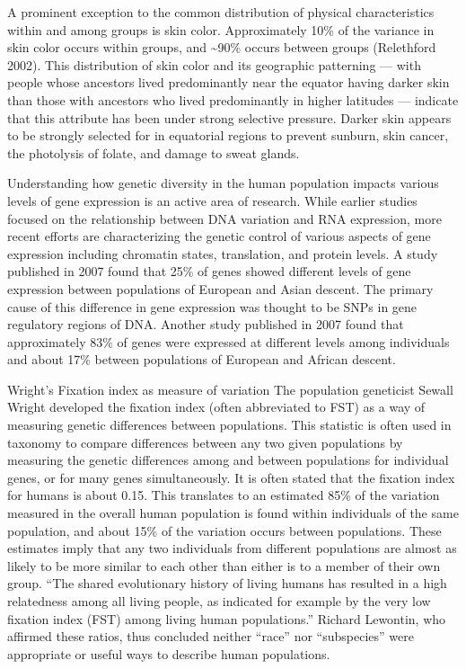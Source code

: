 A prominent exception to the common distribution of physical characteristics within and among groups is skin color. Approximately 10\% of the variance in skin color occurs within groups, and \textasciitilde{}90\% occurs between groups (Relethford 2002). This distribution of skin color and its geographic patterning --- with people whose ancestors lived predominantly near the equator having darker skin than those with ancestors who lived predominantly in higher latitudes --- indicate that this attribute has been under strong selective pressure. Darker skin appears to be strongly selected for in equatorial regions to prevent sunburn, skin cancer, the photolysis of folate, and damage to sweat glands.

Understanding how genetic diversity in the human population impacts various levels of gene expression is an active area of research. While earlier studies focused on the relationship between DNA variation and RNA expression, more recent efforts are characterizing the genetic control of various aspects of gene expression including chromatin states, translation, and protein levels. A study published in 2007 found that 25\% of genes showed different levels of gene expression between populations of European and Asian descent. The primary cause of this difference in gene expression was thought to be SNPs in gene regulatory regions of DNA. Another study published in 2007 found that approximately 83\% of genes were expressed at different levels among individuals and about 17\% between populations of European and African descent.

Wright's Fixation index as measure of variation
The population geneticist Sewall Wright developed the fixation index (often abbreviated to FST) as a way of measuring genetic differences between populations. This statistic is often used in taxonomy to compare differences between any two given populations by measuring the genetic differences among and between populations for individual genes, or for many genes simultaneously. It is often stated that the fixation index for humans is about 0.15. This translates to an estimated 85\% of the variation measured in the overall human population is found within individuals of the same population, and about 15\% of the variation occurs between populations. These estimates imply that any two individuals from different populations are almost as likely to be more similar to each other than either is to a member of their own group. ``The shared evolutionary history of living humans has resulted in a high relatedness among all living people, as indicated for example by the very low fixation index (FST) among living human populations.'' Richard Lewontin, who affirmed these ratios, thus concluded neither ``race'' nor ``subspecies'' were appropriate or useful ways to describe human populations.

